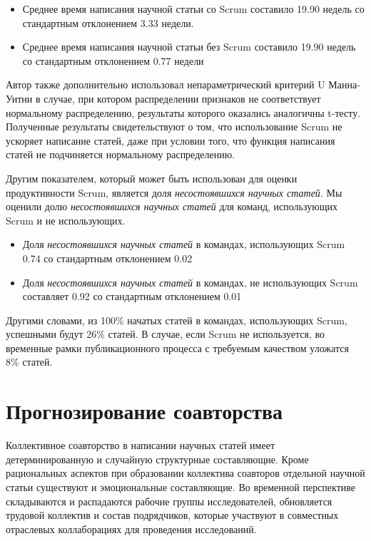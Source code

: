 \begin{itemize}
\tightlist
\item
  Среднее время написания научной статьи со Scrum составило 19.90 недель со стандартным отклонением 3.33 недели.
\item
  Среднее время написания научной статьи без Scrum составило 19.90 недель со стандартным отклонением 0.77 недели
\end{itemize}

Автор также дополнительно использовал непараметрический критерий U Манна-Уитни в случае, при котором распределении признаков не соответствует нормальному распределению, результаты которого оказались аналогичны t-тесту.
Полученные результаты свидетельствуют о том, что использование Scrum не ускоряет написание статей, даже при условии того, что функция написания статей не подчиняется нормальному распределению.

Другим показателем, который может быть использован для оценки продуктивности Scrum, является доля \emph{несостоявшихся научных статей}. 
Мы оценили долю \emph{несостоявшихся научных статей} для команд, использующих Scrum и не использующих.

\begin{itemize}
\tightlist
\item
  Доля \emph{несостоявшихся научных статей} в командах, использующих
  Scrum 0.74 со стандартным отклонением 0.02
\item
  Доля \emph{несостоявшихся научных статей} в командах, не использующих
  Scrum составляет 0.92 со стандартным отклонением 0.01
\end{itemize}

Другими словами, из 100\% начатых статей в командах, использующих Scrum, успешными будут 26\% статей. 
В случае, если Scrum не используется, во временные рамки публикационного процесса с требуемым качеством уложатся 8\% статей.

\section{Прогнозирование соавторства}

Коллективное соавторство в написании научных статей имеет детерминированную и случайную структурные составляющие. 
Кроме рациональных аспектов при образовании коллектива соавторов отдельной научной статьи существуют и эмоциональные составляющие. 
Во временной перспективе складываются и распадаются рабочие группы исследователей, обновляется трудовой коллектив и состав подрядчиков, которые участвуют в совместных отраслевых коллаборациях для проведения исследований.

